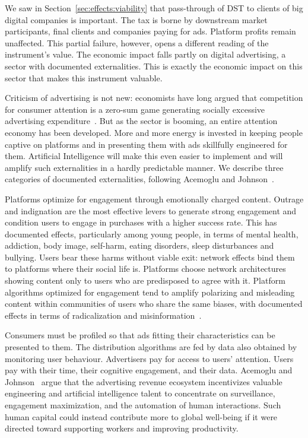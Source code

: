 \documentclass[../../main]{subfiles}
\begin{document}
We saw in Section~\ref{sec:effects:viability} that pass-through of DST to clients of big digital companies is important.
The tax is borne by downstream market participants, final clients and companies paying for ads.
Platform profits remain unaffected.
This partial failure, however, opens a different reading of the instrument's value.
The economic impact falls partly on digital advertising, a sector with documented externalities.
This is exactly the economic impact on this sector that makes this instrument valuable.

Criticism of advertising is not new: economists have long argued that competition for consumer attention is a zero-sum game generating socially excessive advertising expenditure~\citep{dixit_norman_1978}. %
But as the sector is booming, an entire attention economy has been developed.
More and more energy is invested in keeping people captive on platforms and in presenting them with ads skillfully engineered for them.
Artificial Intelligence will make this even easier to implement and will amplify such externalities in a hardly predictable manner.
We describe three categories of documented externalities, following Acemoglu and Johnson~\citep{acemoglu_johnson_2024_ad_tax}.

Platforms optimize for engagement through emotionally charged content.
Outrage and indignation are the most effective levers to generate strong engagement and condition users to engage in purchases with a higher success rate.
This has documented effects, particularly among young people, in terms of mental health, addiction, body image, self-harm, eating disorders, sleep disturbances and bullying.
Users bear these harms without viable exit: network effects bind them to platforms where their social life is.
Platforms choose network architectures showing content only to users who are predisposed to agree with it.
Platform algorithms optimized for engagement tend to amplify polarizing and misleading content within communities of users who share the same biases, with documented effects in terms of radicalization and misinformation~\citep{acemoglu_ozdaglar_siderius_2024}.
 

Consumers must be profiled so that ads fitting their characteristics can be presented to them.
The distribution algorithms are fed by data also obtained by monitoring user behaviour.
Advertisers pay for access to users' attention.
Users pay with their time, their cognitive engagement, and their data.
Acemoglu and Johnson~\citep{acemoglu_johnson_2024_ad_tax} argue that the advertising revenue ecosystem incentivizes valuable engineering and artificial intelligence talent to concentrate on surveillance, engagement maximization, and the automation of human interactions.
Such human capital could instead contribute more to global well-being if it were directed toward supporting workers and improving productivity.
\end{document}
